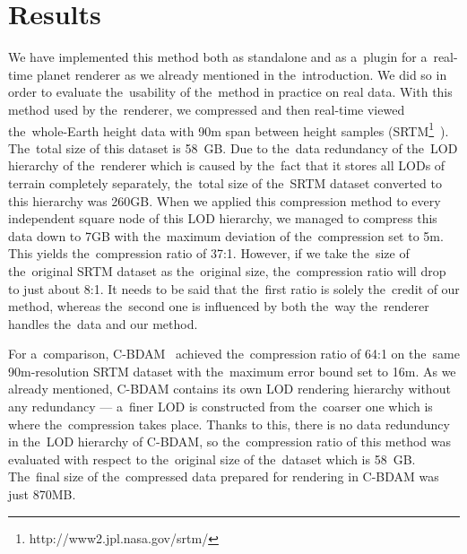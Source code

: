 \chapter{Results}\label{chap:results}

We have implemented this method both as standalone and as a~plugin for a~real-time planet renderer as we already mentioned in the~introduction. We did so in order to evaluate the~usability of the~method in practice on real data. With this method used by the~renderer, we compressed and then real-time viewed the~whole-Earth height data with 90m span between height samples (SRTM\footnote{http://www2.jpl.nasa.gov/srtm/}~\cite{srtm}). The~total size of this dataset is 58~GB. Due to the~data redundancy of the~LOD hierarchy of the~renderer which is caused by the~fact that it stores all LODs of terrain completely separately, the~total size of the~SRTM dataset converted to this hierarchy was 260GB. When we applied this compression method to every independent square node of this LOD hierarchy, we managed to compress this data down to 7GB with the~maximum deviation of the~compression set to 5m. This yields the~compression ratio of 37:1. However, if we take the~size of the~original SRTM dataset as the~original size, the~compression ratio will drop to just about 8:1. It needs to be said that the~first ratio is solely the~credit of our method, whereas the~second one is influenced by both the~way the~renderer handles the~data and our method. 

For a~comparison, C-BDAM~\cite{cbdam} achieved the~compression ratio of 64:1 on the~same 90m-resolution SRTM dataset with the~maximum error bound set to 16m. As we already mentioned, C-BDAM contains its own LOD rendering hierarchy without any redundancy --- a~finer LOD is constructed from the~coarser one which is where the~compression takes place. Thanks to this, there is no data redunduncy in the~LOD hierarchy of C-BDAM, so the~compression ratio of this method was evaluated with respect to the~original size of the~dataset which is 58~GB. The~final size of the~compressed data prepared for rendering in C-BDAM was just 870MB.

